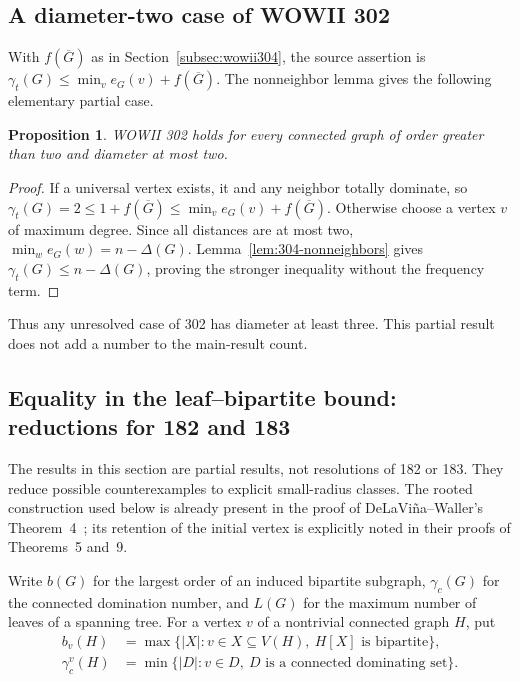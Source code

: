 \documentclass[11pt,a4paper]{article}
\newtheorem{proposition}[theorem]{Proposition}
\theoremstyle{remark}
\begin{document}
\subsection{A diameter-two case of WOWII 302}
\label{r8:partial302}
With $f(\overline G)$ as in Section~\ref{subsec:wowii304}, the source
assertion is $\gamma_t(G)\le\min_v e_G(v)+f(\overline G)$.
The nonneighbor lemma gives the following elementary partial case.
\begin{proposition}
WOWII 302 holds for every connected graph of order greater than two
and diameter at most two.
\end{proposition}
\begin{proof}
If a universal vertex exists, it and any neighbor totally dominate,
so $\gamma_t(G)=2\le1+f(\overline G)\le\min_v e_G(v)+f(\overline G)$.
Otherwise choose a vertex $v$ of maximum degree. Since all distances
are at most two, $\min_w e_G(w)=n-\Delta(G)$.
Lemma~\ref{lem:304-nonneighbors} gives
$\gamma_t(G)\le n-\Delta(G)$, proving the stronger inequality
without the frequency term.
\end{proof}
Thus any unresolved case of 302 has diameter at least three.
This partial result does not add a number to the main-result count.

\subsection{Equality in the leaf--bipartite bound: reductions for 182 and 183}
\label{r8:sec-leaf-residual}

The results in this section are partial results, not resolutions of 182
or 183.  They reduce possible counterexamples to explicit small-radius
classes.  The rooted construction used below is already present in the
proof of DeLaVi\~na--Waller's Theorem~4~\cite{R8DW2008}; its retention of
the initial vertex is explicitly noted in their proofs of Theorems~5
and~9.

Write $b(G)$ for the largest order of an induced bipartite subgraph,
$\gamma_c(G)$ for the connected domination number, and $L(G)$ for
the maximum number of leaves of a spanning tree.  For a vertex $v$ of a
nontrivial connected graph $H$, put
\begin{align*}
 b_v(H)&=\max\{|X|:v\in X\subseteq V(H),\ H[X]\text{ is bipartite}\},\\
 \gamma_c^v(H)&=\min\{|D|:v\in D,\ D\text{ is a connected dominating set}\}.
\end{align*}
\end{document}
